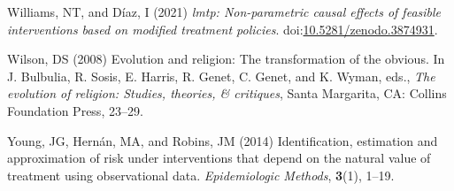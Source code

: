 \documentclass[
  single column]{article}
\newlength{\cslhangindent}
\newenvironment{CSLReferences}[2] %
 {\begin{list}{}{%
  \setlength{\itemindent}{0pt}
  \setlength{\leftmargin}{0pt}
  \setlength{\parsep}{0pt}
  \ifodd #1
   \setlength{\leftmargin}{\cslhangindent}
   \setlength{\itemindent}{-1\cslhangindent}
  \fi
  \setlength{\itemsep}{#2\baselineskip}}}
 {\end{list}}
\begin{document}
\begin{CSLReferences}{1}{0}
Williams, NT, and Díaz, I (2021) \emph{{l}mtp: Non-parametric causal
effects of feasible interventions based on modified treatment policies}.
doi:\href{https://doi.org/10.5281/zenodo.3874931}{10.5281/zenodo.3874931}.

Wilson, DS (2008) Evolution and religion: The transformation of the
obvious. In J. Bulbulia, R. Sosis, E. Harris, R. Genet, C. Genet, and K.
Wyman, eds., \emph{The evolution of religion: Studies, theories, \&
critiques}, Santa Margarita, CA: Collins Foundation Press, 23--29.

Young, JG, Hernán, MA, and Robins, JM (2014) Identification, estimation
and approximation of risk under interventions that depend on the natural
value of treatment using observational data. \emph{Epidemiologic
Methods}, \textbf{3}(1), 1--19.

\end{CSLReferences}
\end{document}
